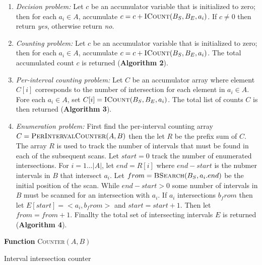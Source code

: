 \documentclass{bioinfo}
\begin{document}
	\begin{enumerate}

		\item
		{\em Decision problem:} Let $c$ be an accumulator variable that is
		initialized to zero; then for each $a_i \in A$, accumulate $c = c +
		\textsc{ICount}(B_S,B_E,a_i)$.  If $c\ne0$ then return {\em yes}, otherwise
		return {\em no}.

		\item
		{\em Counting problem:}  Let $c$ be an accumulator variable that is
		initialized to zero; then for each $a_i \in A$, accumulate $c = c +
		\textsc{ICount}(B_S,B_E,a_i)$.  The total accumulated count $c$ is 
		returned (\textbf{Algorithm 2}).

		\item
		{\em Per-interval counting problem:} Let $C$ be an accumulator
		array where element $C[i]$ corresponds to the number of
		intersection for each element in $a_i\in A$.  Fore each $a_i \in A$,
		set $C[i]=\textsc{ICount}(B_S,B_E,a_i)$.  The total list of counts $C$ is then
		returned (\textbf{Algorithm 3}).

		\item
		{\em Enumeration problem:}
		First find the per-interval counting array $C=\textsc{PerIntervalCounter}(A,B)$
		then the let $R$ be the prefix sum of $C$. The array $R$ is used to track the
		number of intervals that must be found in each of the subsequent scans.  Let
		$start = 0$ track the number of enumerated intersections.
		For $i=1\dots|A|$, let $end = R[i]$ where $end - start$ is the nubmer intervals
		in $B$ that intersect $a_i$.  Let $from=\textsc{BSearch}(B_S, a_i.end)$ be
		the initial position of the scan.  While $end - start > 0$ some number of
		intervals in $B$ must be scanned for an intersection with $a_i$.  If $a_i$
		intersections $b_from$ then let $E[start] = <a_i, b_from>$ and 
		$start=start+1$.  Then let $from = from +1$.  Finallty the total set of
		intersecting intervals $E$ is returned (\textbf{Algorithm 4}).
	\end{enumerate}
	
	\begin{algorithm}[h]
		\DontPrintSemicolon
		\footnotesize
		\BlankLine
		\textbf{Function} \textsc{Counter}$(A,B)$
		\caption{Interval intersection counter}
	\end{algorithm}
\end{document}
